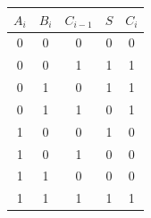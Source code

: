 \documentclass[11pt]{article}
\begin{document}
    \begin{table}[h!]
        \centering
        \begin{tabular}{|c c c|c|c|}
        $A_{i}$ & $B_{i}$ & $C_{i - 1}$ & $S$ & $C_{i}$ \\
        \hline
        0 & 0 & 0 & 0 & 0 \\
        0 & 0 & 1 & 1 & 1 \\
        0 & 1 & 0 & 1 & 1 \\
        0 & 1 & 1 & 0 & 1 \\
        1 & 0 & 0 & 1 & 0 \\
        1 & 0 & 1 & 0 & 0 \\
        1 & 1 & 0 & 0 & 0 \\
        1 & 1 & 1 & 1 & 1 \\
        \hline
        \end{tabular}
        \label{tab:tb}
    \end{table}
\end{document}
